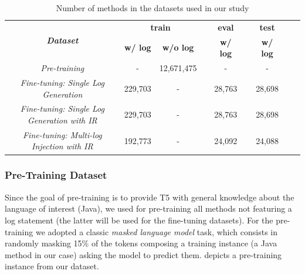 \begin{table}[h]
	\centering
	\caption{Number of methods in the datasets used in our study}
		\label{tab:ds-summary-1}
	\begin{tabular}{ccccccccc}
		\toprule
		\multirow{2}{*}{\textit{\textbf{Dataset}}} & \multicolumn{2}{c}{\textbf{train}} & \textbf{} & \textbf{eval} & \textbf{} & \textbf{test}  \\ \cline{2-3} \cline{5-5} \cline{7-7} 
		& \textbf{w/ log} & \textbf{w/o log} & \textbf{} & \textbf{w/ log} & \textbf{} & \textbf{w/ log} \\ \midrule
		\textit{Pre-training}              & -               &      12,671,475  &           & -               &           &  -               \\
		\textit{Fine-tuning: Single Log Generation}               & 229,703         & -                &           & 28,763          &           & 28,698          \\
		\textit{Fine-tuning: Single Log Generation with IR}               & 229,703         & -                &           & 28,763          &           & 28,698          \\
		\textit{Fine-tuning: Multi-log Injection with IR}               & 192,773         & -                &           & 24,092         &           & 24,088          \\
		\bottomrule
	\end{tabular}
\end{table}

\subsubsection{Pre-Training Dataset}
\label{sub:pretraining}
Since the goal of pre-training is to provide T5 with general knowledge about the language of interest (\ie Java), we used for pre-training all methods not featuring a log statement (the latter will be used for the fine-tuning datasets). For the pre-training we adopted a classic \emph{masked language model} task, which consists in randomly masking 15\% of the tokens composing a training instance (\ie a Java method in our case) asking the model to predict them.  depicts a pre-training instance from our dataset.


